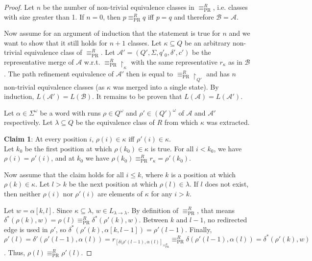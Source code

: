 \begin{proof}
	Let $n$ be the number of non-trivial equivalence classes in $\equiv_\text{PR}^R$, i.e. classes with size greater than 1. If $n = 0$, then $p \equiv_\text{PR}^R q$ iff $p = q$ and therefore $\mathcal{B} = \mathcal{A}$. 
	
	Now assume for an argument of induction that the statement is true for $n$ and we want to show that it still holds for $n+1$ classes. Let $\kappa \subseteq Q$ be an arbitrary non-trivial equivalence class of $\equiv_\text{PR}^R$. Let $\mathcal{A}' = (Q', \Sigma, q'_0, \delta', c')$ be the representative merge of $\mathcal{A}$ w.r.t. $\equiv_\text{PR}^R \upharpoonright_\kappa$ with the same representative $r_\kappa$ as in $\mathcal{B}$. The path refinement equivalence of $\mathcal{A}'$ then is equal to $\equiv_\text{PR}^R \upharpoonright_{Q'}$ and has $n$ non-trivial equivalence classes (as $\kappa$ was merged into a single state). By induction, $L(\mathcal{A}') = L(\mathcal{B})$. It remains to be proven that $L(\mathcal{A}) = L(\mathcal{A}')$.
	
	Let $\alpha \in \Sigma^\omega$ be a word with runs $\rho \in Q^\omega$ and $\rho' \in (Q')^\omega$ of $\mathcal{A}$ and $\mathcal{A}'$ respectively. Let $\lambda \subseteq Q$ be the equivalence class of $R$ from which $\kappa$ was extracted.

	\vspace{5pt}
	\textbf{Claim 1}: At every position $i$, $\rho(i) \in \kappa$ iff $\rho'(i) \in \kappa$. \\
	Let $k_0$ be the first position at which $\rho(k_0) \in \kappa$ is true. For all $i < k_0$, we have $\rho(i) = \rho'(i)$, and at $k_0$ we have $\rho(k_0) \equiv_\text{PR}^R r_\kappa = \rho'(k_0)$.
	
	Now assume that the claim holds for all $i \leq k$, where $k$ is a position at which $\rho(k) \in \kappa$. Let $l > k$ be the next position at which $\rho(l) \in \lambda$. If $l$ does not exist, then neither $\rho(i)$ nor $\rho'(i)$ are elements of $\kappa$ for any $i > k$.
	
	Let $w = \alpha[k, l]$. Since $\kappa \subseteq \lambda$, $w \in L_{\lambda \rightarrow \lambda}$. By definition of $\equiv_\text{PR}^R$, that means $\delta^*(\rho(k), w) = \rho(l) \equiv_\text{PR}^R \delta^*(\rho'(k), w)$. Between $k$ and $l-1$, no redirected edge is used in $\rho'$, so $\delta^*(\rho'(k), \alpha[k, l-1]) = \rho'(l-1)$. Finally, $\rho'(l) = \delta'(\rho'(l-1), \alpha(l)) = r_{[\delta(\rho'(l-1), \alpha(l)]_{\equiv_\text{PR}^R}} \equiv_\text{PR}^R \delta(\rho'(l-1), \alpha(l)) = \delta^*(\rho'(k), w)$. Thus, $\rho(l) \equiv_\text{PR}^R \rho'(l)$.
	

\end{proof}
